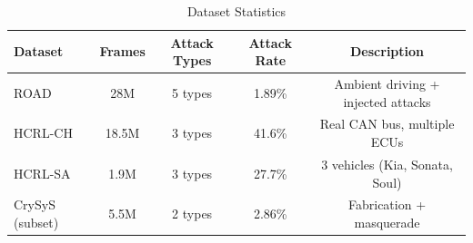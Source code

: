\begin{table}[t]
\centering
\caption{Dataset Statistics}
\label{tab:datasets}
\small
\begin{tabular}{lcccc}
\toprule
Dataset & Frames & Attack Types & Attack Rate & Description \\
\midrule
ROAD & 28M & 5 types & 1.89\% & Ambient driving + injected attacks \\
HCRL-CH & 18.5M & 3 types & 41.6\% & Real CAN bus, multiple ECUs \\
HCRL-SA & 1.9M & 3 types & 27.7\% & 3 vehicles (Kia, Sonata, Soul) \\
CrySyS (subset) & 5.5M & 2 types & 2.86\% & Fabrication + masquerade \\
\bottomrule
\end{tabular}
\end{table}